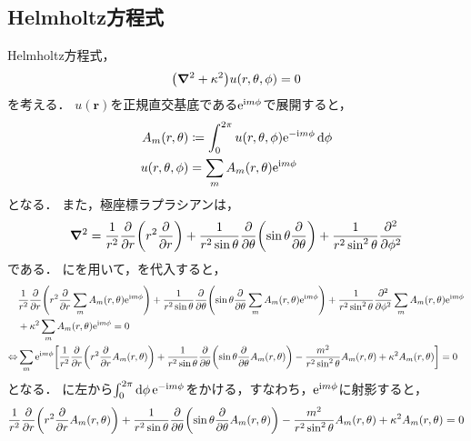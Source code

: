 \documentclass{report}
\begin{document}
  \subsection{Helmholtz方程式}
    Helmholtz方程式，
    \begin{align}
      \qty(\grad^2 + \kappa^2)u(r, \theta, \phi) = 0\label{helmholtz-eq-wave}
    \end{align}
    を考える．
    $u(\bm{r})$を正規直交基底である$\mathrm{e}^{\mathrm{i} m\phi}$で展開すると，
    \begin{align}
      A_m(r, \theta) &\coloneqq \int_{0}^{2\pi}u(r, \theta, \phi)\mathrm{e}^{-\mathrm{i} m\phi}\dd{\phi} \\ 
      u(r, \theta, \phi) &= \sum_{m}A_m(r, \theta)\mathrm{e}^{\mathrm{i} m\phi}\label{u-expand-with-a} \\ 
    \end{align}
    となる．
    また，極座標ラプラシアンは，
    \begin{align}
      \grad^2 = \frac{1}{r^2}\pdv{r}\qty(r^2\pdv{r}) + \frac{1}{r^2\sin\theta}\pdv{\theta}\qty(\sin\theta\pdv{\theta}) + \frac{1}{r^2\sin^2\theta}\pdv[2]{\phi} \label{polar-laplacian}
    \end{align}
    である．
    にを用いて，を代入すると，
    \begin{align}
      &\frac{1}{r^2}\pdv{r}\qty(r^2\pdv{r}\sum_{m}A_m(r, \theta)\mathrm{e}^{\mathrm{i} m\phi}) + \frac{1}{r^2\sin\theta}\pdv{\theta}\qty(\sin\theta\pdv{\theta}\sum_{m}A_m(r, \theta)\mathrm{e}^{\mathrm{i} m\phi}) + \frac{1}{r^2\sin^2\theta}\pdv[2]{\phi}\sum_{m}A_m(r, \theta)\mathrm{e}^{\mathrm{i} m\phi} \notag \\ 
      &+ \kappa^2\sum_{m}A_m(r, \theta)\mathrm{e}^{\mathrm{i} m\phi} = 0 \\ 
      \Leftrightarrow &\sum_{m}\mathrm{e}^{\mathrm{i} m\phi}\qty[
        \frac{1}{r^2}\pdv{r}\qty(r^2\pdv{r}A_m(r, \theta)) + 
        \frac{1}{r^2\sin\theta}\pdv{\theta}\qty(\sin\theta\pdv{\theta}A_m(r, \theta)) 
        - \frac{m^2}{r^2\sin^2\theta}A_m(r, \theta) + \kappa^2A_m(r, \theta)
      ] = 0 \label{am-before-int}
    \end{align}
    となる．
    に左から$\int_{0}^{2\pi}\dd{\phi}\mathrm{e}^{-\mathrm{i} m\phi}$をかける，すなわち，$\mathrm{e}^{\mathrm{i} m\phi}$に射影すると，
    \begin{align}
      \frac{1}{r^2}\pdv{r}\qty(r^2\pdv{r}A_m(r, \theta)) + \frac{1}{r^2\sin\theta}\pdv{\theta}\qty(\sin\theta\pdv{\theta}A_m(r, \theta)) - \frac{m^2}{r^2\sin^2\theta}A_m(r, \theta) + \kappa^2A_m(r, \theta) = 0 \label{a-condition}
    \end{align}
\end{document}
